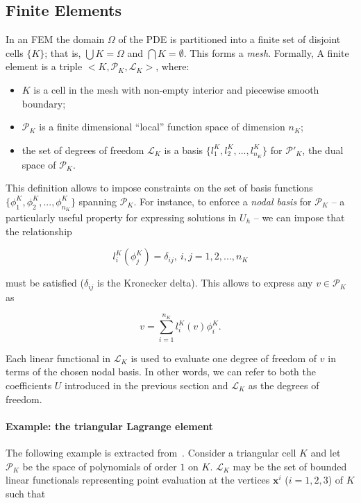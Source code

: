 \subsection{Finite Elements}
In an FEM the domain $\Omega$ of the PDE is partitioned into a finite set of disjoint cells $\lbrace K \rbrace$; that is, $\bigcup K = \Omega$ and $\bigcap K = \emptyset$. This forms a {\em mesh}. Formally, A finite element is a triple ${<}K,\mathcal{P}_K,\mathcal{L}_K{>}$, where:
\begin{itemize}
\item $K$ is a cell in the mesh with non-empty interior and piecewise smooth boundary;
\item $\mathcal{P}_K$ is a finite dimensional ``local'' function space of dimension $n_K$;
\item the set of degrees of freedom $\mathcal{L}_K$ is a basis $\lbrace l_1^K, l_2^K, ..., l_{n_K}^K\rbrace$ for $\mathcal{P}'_K$, the dual space of $\mathcal{P}_K$. 
\end{itemize}
This definition allows to impose constraints on the set of basis functions $\lbrace \phi_1^K, \phi_2^K, ..., \phi_{n_K}^K\rbrace$ spanning $\mathcal{P}_K$. For instance, to enforce a {\em nodal basis} for $\mathcal{P}_K$ -- a particularly useful property for expressing solutions in $U_h$ -- we can impose that the relationship

\begin{equation}
l_i^K(\phi_j^K) = \delta_{ij},\ i,j = 1,2,...,n_K
\end{equation}

must be satisfied ($\delta_{ij}$ is the Kronecker delta). This allows to express any $v \in \mathcal{P}_K$ as

\begin{equation}
v = \sum_{i=1}^{n_K} l_i^K(v) \phi_i^K.
\end{equation}

Each linear functional in $\mathcal{L}_K$ is used to evaluate one degree of freedom of $v$ in terms of the chosen nodal basis. In other words, we can refer to both the coefficients $U$ introduced in the previous section and $\mathcal{L}_K$ as the degrees of freedom.

\paragraph{Example: the triangular Lagrange element}
The following example is extracted from~\cite{Fenics}. Consider a triangular cell $K$ and let $\mathcal{P}_K$ be the space of polynomials of order $1$ on $K$. $\mathcal{L}_K$ may be the set of bounded linear functionals representing point evaluation at the vertices $\boldsymbol{x}^i$ ($i=1,2,3$) of $K$ such that

